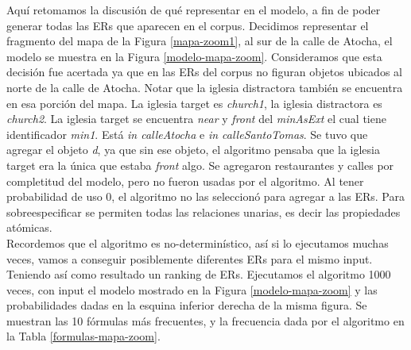 Aqu\'i retomamos la discusi\'on de qu\'e representar en el modelo, a fin de poder generar todas las ERs que aparecen en el corpus. Decidimos representar el fragmento del mapa de la Figura \ref{mapa-zoom1}, al sur de la calle de Atocha, el modelo se muestra en la Figura \ref{modelo-mapa-zoom}. Consideramos que esta decisi\'on fue acertada ya que en las ERs del corpus no figuran objetos ubicados al norte de la calle de Atocha. Notar que la iglesia distractora tambi\'en se encuentra en esa porci\'on del mapa. La iglesia target es {\it church1}, la iglesia distractora es {\it church2}. La iglesia target se encuentra {\it near} y {\it front} del {\it minAsExt} el cual tiene identificador {\it min1}. Est\'a {\it in calleAtocha} e {\it in calleSantoTomas}. Se tuvo que agregar el objeto {\it d}, ya que sin ese objeto, el algoritmo pensaba que la iglesia target era la \'unica que estaba {\it front} algo. Se agregaron restaurantes y calles por completitud del modelo, pero no fueron usadas por el algoritmo. Al tener probabilidad de uso 0, el algoritmo no las seleccion\'o para agregar a las ERs. Para sobreespecificar se permiten todas las relaciones unarias, es decir las propiedades at\'omicas.\\
Recordemos que el algoritmo es no-determin\'istico, as\'i si lo ejecutamos muchas veces, vamos a conseguir posiblemente diferentes ERs para el mismo input. Teniendo as\'i como resultado un ranking de ERs.
Ejecutamos el algoritmo 1000 veces, con input el modelo mostrado en la Figura \ref{modelo-mapa-zoom} y las probabilidades dadas en la esquina inferior derecha de la misma figura. Se muestran las 10 f\'ormulas m\'as frecuentes, y la frecuencia dada por el algoritmo en la Tabla \ref{formulas-mapa-zoom}. 

